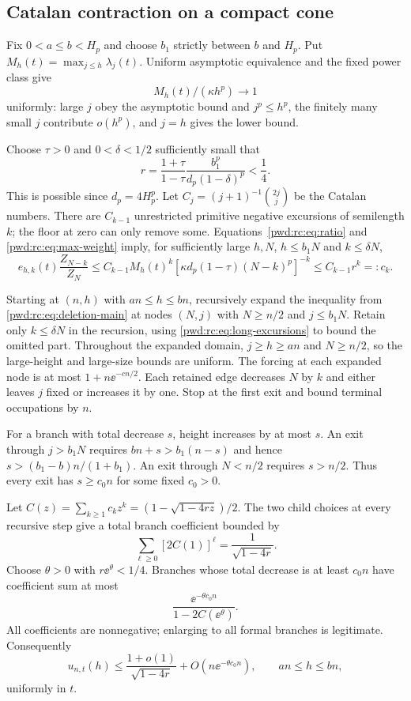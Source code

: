 \documentclass[11pt,letterpaper]{article}
\numberwithin{equation}{section}
\theoremstyle{remark}\newtheorem{remark}[theorem]{Remark}
\begin{document}
\subsection{Catalan contraction on a compact cone}
Fix $0<a\le b<H_p$ and choose $b_1$ strictly between $b$ and $H_p$. Put $M_h(t)=\max_{j\le h}\lambda_j(t)$. Uniform asymptotic equivalence and the fixed power class give
\begin{equation}\label{pwd:rc:eq:max-weight}
 M_h(t)/(\kappa h^p)\longrightarrow1
\end{equation}
uniformly: large $j$ obey the asymptotic bound and $j^p\le h^p$, the finitely many small $j$ contribute $o(h^p)$, and $j=h$ gives the lower bound.

Choose $\tau>0$ and $0<\delta<1/2$ sufficiently small that
\begin{equation}\label{pwd:rc:eq:r-local}
 r=\frac{1+\tau}{1-\tau}\frac{b_1^p}{d_p(1-\delta)^p}<\frac14.
\end{equation}
This is possible since $d_p=4H_p^p$. Let $C_j=(j+1)^{-1}\binom{2j}{j}$ be the Catalan numbers. There are $C_{k-1}$ unrestricted primitive negative excursions of semilength $k$; the floor at zero can only remove some. Equations~\eqref{pwd:rc:eq:ratio} and \eqref{pwd:rc:eq:max-weight} imply, for sufficiently large $h,N$, $h\le b_1N$ and $k\le\delta N$,
\begin{equation}\label{pwd:rc:eq:catalan-bound}
 e_{h,k}(t)\frac{Z_{N-k}}{Z_N}
 \le C_{k-1}M_h(t)^k
 [\kappa d_p(1-\tau)(N-k)^p]^{-k}
 \le C_{k-1}r^k=:c_k.
\end{equation}

Starting at $(n,h)$ with $an\le h\le bn$, recursively expand the inequality from \eqref{pwd:rc:eq:deletion-main} at nodes $(N,j)$ with $N\ge n/2$ and $j\le b_1N$. Retain only $k\le\delta N$ in the recursion, using \eqref{pwd:rc:eq:long-excursions} to bound the omitted part. Throughout the expanded domain, $j\ge h\ge an$ and $N\ge n/2$, so the large-height and large-size bounds are uniform. The forcing at each expanded node is at most $1+n\ee^{-cn/2}$. Each retained edge decreases $N$ by $k$ and either leaves $j$ fixed or increases it by one. Stop at the first exit and bound terminal occupations by $n$.

For a branch with total decrease $s$, height increases by at most $s$. An exit through $j>b_1N$ requires $bn+s>b_1(n-s)$ and hence $s>(b_1-b)n/(1+b_1)$. An exit through $N<n/2$ requires $s>n/2$. Thus every exit has $s\ge c_0n$ for some fixed $c_0>0$.

Let $C(z)=\sum_{k\ge1}c_kz^k=(1-\sqrt{1-4rz})/2$. The two child choices at every recursive step give a total branch coefficient bounded by
\[
 \sum_{\ell\ge0}[2C(1)]^\ell=\frac1{\sqrt{1-4r}}.
\]
Choose $\theta>0$ with $r\ee^\theta<1/4$. Branches whose total decrease is at least $c_0n$ have coefficient sum at most
\[
 \frac{\ee^{-\theta c_0n}}{1-2C(\ee^\theta)}.
\]
All coefficients are nonnegative; enlarging to all formal branches is legitimate. Consequently
\begin{equation}\label{pwd:rc:eq:local-upper}
 u_{n,t}(h)\le\frac{1+o(1)}{\sqrt{1-4r}}+O(n\ee^{-\theta c_0n}),
 \qquad an\le h\le bn,
\end{equation}
uniformly in $t$.
\end{document}
